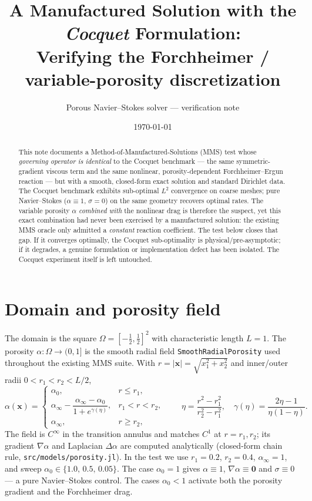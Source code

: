 \documentclass[11pt]{article}
\title{A Manufactured Solution with the \emph{Cocquet} Formulation:\\
       Verifying the Forchheimer / variable-porosity discretization}
\author{Porous Navier--Stokes solver --- verification note}
\date{\today}
\newcommand{\xx}{\bm{x}}
\newcommand{\grad}{\nabla}
\begin{document}
\maketitle

\begin{abstract}
This note documents a Method-of-Manufactured-Solutions (MMS) test whose
\emph{governing operator is identical} to the Cocquet benchmark --- the same
symmetric-gradient viscous term and the same nonlinear, porosity-dependent
Forchheimer--Ergun reaction --- but with a smooth, closed-form exact solution
and standard Dirichlet data. The Cocquet benchmark exhibits sub-optimal
$L^2$ convergence on coarse meshes; pure Navier--Stokes ($\alpha\equiv 1$,
$\sigma=0$) on the same geometry recovers optimal rates. The variable porosity
$\alpha$ \emph{combined with} the nonlinear drag is therefore the suspect, yet
this exact combination had never been exercised by a manufactured solution: the
existing MMS oracle only admitted a \emph{constant} reaction coefficient. The
test below closes that gap. If it converges optimally, the Cocquet
sub-optimality is physical/pre-asymptotic; if it degrades, a genuine
formulation or implementation defect has been isolated. The Cocquet experiment
itself is left untouched.
\end{abstract}

\section{Domain and porosity field}

The domain is the square $\Omega=[-\tfrac12,\tfrac12]^2$ with characteristic
length $L=1$. The porosity $\alpha:\Omega\to(0,1]$ is the smooth radial field
\texttt{SmoothRadialPorosity} used throughout the existing MMS suite. With
$r=\lvert\xx\rvert=\sqrt{x_1^2+x_2^2}$ and inner/outer radii $0<r_1<r_2<L/2$,
\begin{equation}
\alpha(\xx)=
\begin{cases}
\alpha_0, & r\le r_1,\\[2pt]
\alpha_\infty-\dfrac{\alpha_\infty-\alpha_0}{1+e^{\gamma(\eta)}}, & r_1<r<r_2,\\[8pt]
\alpha_\infty, & r\ge r_2,
\end{cases}
\qquad
\eta=\frac{r^2-r_1^2}{r_2^2-r_1^2},\quad
\gamma(\eta)=\frac{2\eta-1}{\eta(1-\eta)} .
\label{eq:alpha}
\end{equation}
The field is $C^\infty$ in the transition annulus and matches $C^1$ at
$r=r_1,r_2$; its gradient $\grad\alpha$ and Laplacian $\Delta\alpha$ are
computed analytically (closed-form chain rule, \texttt{src/models/porosity.jl}).
In the test we use $r_1=0.2$, $r_2=0.4$, $\alpha_\infty=1$, and sweep
$\alpha_0\in\{1.0,\,0.5,\,0.05\}$. The case $\alpha_0=1$ gives
$\alpha\equiv1$, $\grad\alpha\equiv\bm 0$ and $\sigma\equiv0$ --- a pure
Navier--Stokes control. The cases $\alpha_0<1$ activate both the porosity
gradient and the Forchheimer drag.
\end{document}
